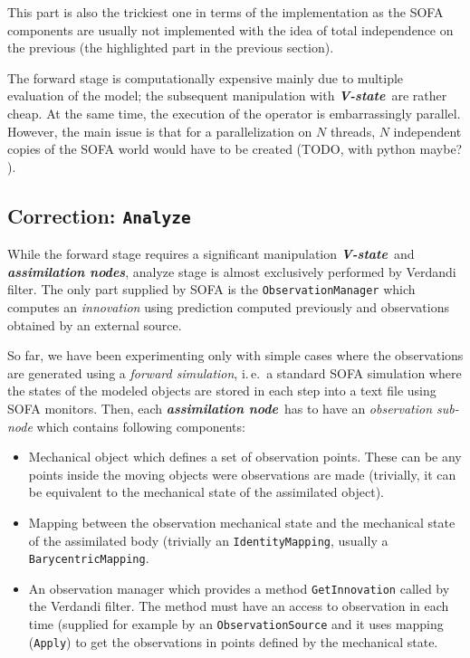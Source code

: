 \documentclass[10pt]{article}
\def\ie{i.\,e.}
\def\asn{\textit{\textbf{assimilation node}}}
\def\asns{\textit{\textbf{assimilation nodes}}}
\def\vstate{\textit{\textbf{V-state}}}
\begin{document}
This part is also the trickiest one in terms of the implementation as the SOFA components are usually not implemented with the idea of total
independence on the previous 
(the highlighted part in the previous section).

The forward stage is computationally  expensive mainly due to multiple evaluation of the model; the subsequent manipulation with \vstate\ are rather
cheap. 
At the same time, the execution of the operator is embarrassingly parallel. However, the main issue is that for a parallelization on $N$ threads, $N$
independent copies of the 
SOFA world would have to be created (TODO, with python maybe? ).


\subsection{Correction: \texttt{Analyze}}
While the forward stage requires a significant manipulation \vstate\ and \asns, analyze stage is almost exclusively performed by Verdandi filter. The
only 
part supplied by SOFA is the \texttt{ObservationManager} which computes an \emph{innovation} using prediction computed previously and observations
obtained by an external source. 

So far, we have been experimenting only with simple cases where the observations are generated using a \emph{forward simulation}, \ie\ a standard SOFA
simulation where 
the states of the modeled objects are stored in each step into a text file using SOFA monitors. Then, each \asn\ has to have an \emph{observation
sub-node} which 
contains following components:
\begin{itemize}
\item Mechanical object which defines a set of observation points. These can be any points inside the moving objects were observations are made
(trivially, it can be equivalent to the mechanical 
state of the assimilated object).
\item Mapping between the observation mechanical state and the mechanical state of the assimilated body (trivially an \texttt{IdentityMapping},
usually a \texttt{BarycentricMapping}.
\item An observation manager which provides a method \texttt{GetInnovation} called by the Verdandi filter. The method must have an access to
observation in each time (supplied for example by an \texttt{ObservationSource} and it uses mapping (\texttt{Apply}) to get the observations in points
defined by the mechanical state. 
\end{itemize}
\end{document}
